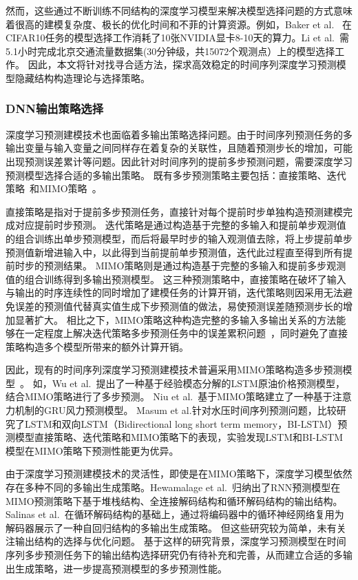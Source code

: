 然而，这些通过不断训练不同结构的深度学习模型来解决模型选择问题的方式意味着很高的建模复杂度、极长的优化时间和不菲的计算资源。例如，Baker et al.~
\cite{bakerDesigning2017}在CIFAR10任务的模型选择工作消耗了10张NVIDIA显卡8-10天的算力。Li et al.~\cite{liAutoST2020}需5.1小时完成北京交通流量数据集(30分钟级，共15072个观测点）上的模型选择工作。
因此，本文将针对找寻合适方法，探求高效稳定的时间序列深度学习预测模型隐藏结构构造理论与选择策略。

\subsubsection{DNN输出策略选择}
深度学习预测建模技术也面临着多输出策略选择问题。由于时间序列预测任务的多输出变量与输入变量之间同样存在着复杂的关联性，且随着预测步长的增加，可能出现预测误差累计等问题\cite{sorjamaaMethodology2007}。因此针对时间序列的提前多步预测问题，需要深度学习预测模型选择合适的多输出策略。
既有多步预测策略主要包括：直接策略、迭代策略~\cite{sorjamaaMethodology2007}和MIMO策略~\cite{bontempiLong2008}。

直接策略是指对于提前多步预测任务，直接针对每个提前时步单独构造预测建模完成对应提前时步预测。
迭代策略是通过构造基于完整的多输入和提前单步观测值的组合训练出单步预测模型，而后将最早时步的输入观测值去除，将上步提前单步预测值新增进输入中，以此得到当前提前单步预测值，迭代此过程直至得到所有提前时步的预测结果。
MIMO策略则是通过构造基于完整的多输入和提前多步观测值的组合训练得到多输出预测模型。
这三种预测策略中，直接策略在破坏了输入与输出的时序连续性的同时增加了建模任务的计算开销，迭代策略则因采用无法避免误差的预测值代替真实值生成下步预测值的做法，易使预测误差随预测步长的增加显著扩大。
相比之下，MIMO策略这种构造完整的多输入多输出关系的方法能够在一定程度上解决迭代策略多步预测任务中的误差累积问题~\cite{baoPSOMISMO2014}，同时避免了直接策略构造多个模型所带来的额外计算开销。

因此，现有的时间序列深度学习预测建模技术普遍采用MIMO策略构造多步预测模型~\cite{hewamalageRecurrent2021}。
如，Wu et al.~\cite{wuImproved2019}提出了一种基于经验模态分解的LSTM原油价格预测模型，结合MIMO策略进行了多步预测。
Niu et al.~\cite{niuWind2020}基于MIMO策略建立了一种基于注意力机制的GRU风力预测模型。
Masum et al.\cite{masumInvestigation2019}针对水压时间序列预测问题，比较研究了LSTM和双向LSTM（Bidirectional long short term memory，BI-LSTM）预测模型直接策略、迭代策略和MIMO策略下的表现，实验发现LSTM和BI-LSTM模型在MIMO策略下预测性能更为优异。

由于深度学习预测建模技术的灵活性，即使是在MIMO策略下，深度学习模型依然存在多种不同的多输出生成策略。Hewamalage et al.~\cite{hewamalageRecurrent2021}归纳出了RNN预测模型在MIMO预测策略下基于堆栈结构、全连接解码结构和循环解码结构的输出结构。Salinas et al.~\cite{salinasDeepAR2020}在循环解码结构的基础上，通过将编码器中的循环神经网络复用为解码器展示了一种自回归结构的多输出生成策略。
但这些研究较为简单，未有关注输出结构的选择与优化问题。
基于这样的研究背景，深度学习预测模型在时间序列多步预测任务下的输出结构选择研究仍有待补充和完善，从而建立合适的多输出生成策略，进一步提高预测模型的多步预测性能。



